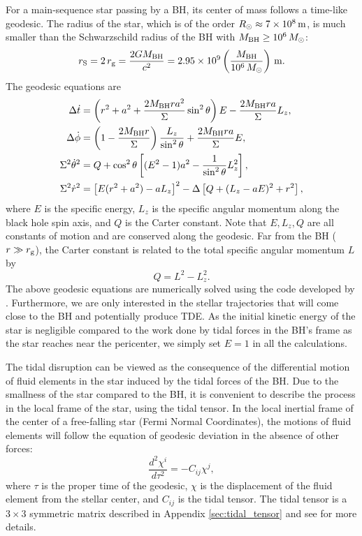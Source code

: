 \documentclass[useAMS,usenatbib]{mn2e}
\def\msun{M_{\rm \odot}}
\def\mBH{M_{\rm BH}}
\def\rg{r_{\rm g}}
\def\Rsun{R_\odot}
\newcommand{\lrb}[1]{\left({#1}\right)}
\newcommand{\lrsb}[1]{\left[{#1}\right]}
\begin{document}
For a main-sequence star passing by a BH, 
its center of mass follows a time-like geodesic.
The radius of the star, which is of the order $\Rsun\approx7\times10^8\,\rm m$, is much smaller than the Schwarzschild radius of the BH with $\mBH\ge10^6\,\msun$:
\begin{equation}
    r_{\rm S}=2\,\rg=\frac{2G\mBH}{c^2}=2.95\times10^9\lrb{\frac{\mBH}{10^6\,\msun}}\,\rm m.
\end{equation}
The geodesic equations are \citep{Carter1968}
\begin{align}
\Delta\dot{t} & =\lrb{r^{2}+a^{2}+\frac{2\mBH ra^{2}}{\Sigma}\sin^{2}\theta}E-\frac{2\mBH ra}{\Sigma}L_{z},\\
\Delta\dot{\phi} & =\lrb{1-\frac{2\mBH r}{\Sigma}}\frac{L_{z}}{\sin^{2}\theta}+\frac{2\mBH ra}{\Sigma}E,\\
\Sigma^{2}\dot{\theta}^{2} & =Q+\cos^{2}\theta\lrsb{(E^{2}-1)a^{2}-\frac{1}{\sin^{2}\theta}L_{z}^{2}},\\
\Sigma^{2}\dot{r}^{2} & =\lrsb{E(r^{2}+a^{2})-aL_{z}}^{2}-\Delta\lrsb{Q+(L_{z}-aE)^{2}+r^{2}},
\end{align}
where $E$ is the specific energy, $L_z$ is the specific angular momentum along the black hole spin axis, and $Q$ is the Carter constant.
Note that $E,L_z,Q$ are all constants of motion and are conserved along the geodesic.
Far from the BH ($r\gg \rg$), the Carter constant is related to the total specific angular momentum $L$ by
\begin{equation}
    Q=L^2-L_z^2.
\end{equation}
The above geodesic equations are numerically solved using the code developed by \citet{Rauch1994}.
Furthermore, we are only interested in the stellar trajectories that will come close to the BH and potentially produce TDE.
As the initial kinetic energy of the star is negligible compared to the work done by tidal forces in the BH's frame as the star reaches near the pericenter, we simply set $E=1$ in all the calculations.

The tidal disruption can be viewed as the consequence of the differential motion of fluid elements in the star induced by the tidal forces of the BH.
Due to the smallness of the star compared to the BH, it is convenient to describe the process in the local frame of the star, using the tidal tensor.
In the local inertial frame of the center of a free-falling star (Fermi Normal Coordinates), the motions of fluid elements will follow the equation of geodesic deviation in the absence of other forces:
\begin{equation}\label{eq:geodesic-deviation}
    \frac{d^{2}\chi^{i}}{d\tau^{2}}=-C_{ij}\chi^{j},
\end{equation}
where $\tau$ is the proper time of the geodesic, $\chi$ is the displacement of the fluid element from the stellar center, and $C_{ij}$ is the tidal tensor.
The tidal tensor is a $3\times3$ symmetric matrix described in Appendix \ref{sec:tidal_tensor} and see \cite{Marck1983} for more details.
\end{document}
